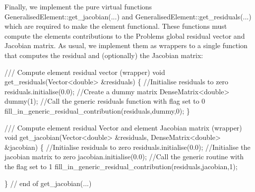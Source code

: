 Finally, we implement the pure virtual functions {\ttfamily Generalised\+Element\+::get\+\_\+jacobian}(...) and {\ttfamily Generalised\+Element\+::get\+\_\+residuals}(...) which are required to make the element functional. These functions must compute the element\textquotesingle{}s contributions to the {\ttfamily Problem\textquotesingle{}s} global residual vector and Jacobian matrix. As usual, we implement them as wrappers to a single function that computes the residual and (optionally) the Jacobian matrix\+:


\begin{DoxyCodeInclude}
 \textcolor{comment}{/// Compute element residual vector (wrapper)}
 \textcolor{keywordtype}{void} get\_residuals(Vector<double> &residuals)
  \{
   \textcolor{comment}{//Initialise residuals to zero}
   residuals.initialise(0.0);
   \textcolor{comment}{//Create a dummy matrix}
   DenseMatrix<double> dummy(1);
   \textcolor{comment}{//Call the generic residuals function with flag set to 0}
   fill\_in\_generic\_residual\_contribution(residuals,dummy,0);
   \}

  \textcolor{comment}{}
\textcolor{comment}{ /// Compute element residual Vector and element Jacobian matrix (wrapper)}
\textcolor{comment}{} \textcolor{keywordtype}{void} get\_jacobian(Vector<double> &residuals,
                   DenseMatrix<double> &jacobian)
  \{
   \textcolor{comment}{//Initialise residuals to zero}
   residuals.initialise(0.0);
   \textcolor{comment}{//Initialise the jacobian matrix to zero}
   jacobian.initialise(0.0);
   \textcolor{comment}{//Call the generic routine with the flag set to 1}
   fill\_in\_generic\_residual\_contribution(residuals,jacobian,1);

  \} \textcolor{comment}{// end of get\_jacobian(...)}

\end{DoxyCodeInclude}


